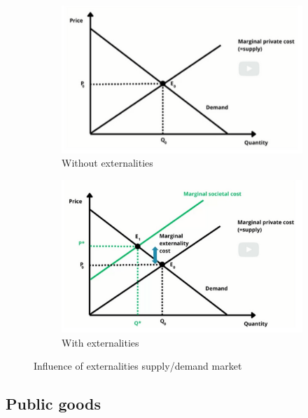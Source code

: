 \documentclass[../summary.tex]{subfiles}
\begin{document}
	  \begin{figure}[htbp]
	  	\centering
	  	\begin{subfigure}{.5\textwidth}
	  		\centering
	  		\includegraphics[width=1\linewidth]{images/10-demand-supply.png}
	  		\caption{Without externalities}
		  	\label{fig:demand-supply}
	  	\end{subfigure}%
	  	\begin{subfigure}{.5\textwidth}
	  		\centering
	  		\includegraphics[width=1\linewidth]{images/10-demand-supply-externalities.png}
	  		\caption{With externalities}
	  		\label{fig:demand-supply-externality}
	  	\end{subfigure}
	  	\caption{Influence of externalities supply/demand market}
	  	\label{fig:influence-externalities}
	\end{figure}
	 
	 \subsection{Public goods}
	 
\end{document}
